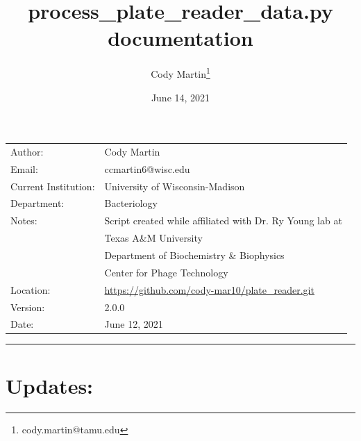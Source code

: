 \documentclass[12pt]{article}
\author{Cody Martin\thanks{cody.martin@tamu.edu}}
\date{June 14, 2021}
\title{process\_plate\_reader\_data.py documentation}
\begin{document}
\maketitle
\begin{center}
\begin{xltabular}{\textwidth}{lX}
\hline
Author: & Cody Martin\\
Email: & ccmartin6@wisc.edu\\
\hline
Current Institution: & University of Wisconsin-Madison\\
Department: & Bacteriology\\
\hline
Notes: & Script created while affiliated with Dr. Ry Young lab at\\
 & Texas A\&M University\\
 & Department of Biochemistry \& Biophysics\\
 & Center for Phage Technology\\
\hline
Location: & \url{https://github.com/cody-mar10/plate\_reader.git}\\
Version: & 2.0.0\\
Date: & June 12, 2021\\
\end{xltabular}
\end{center}

\noindent\rule{\textwidth}{0.5pt}
\section*{Updates:}
\label{sec:org0f7eabb}
\end{document}
